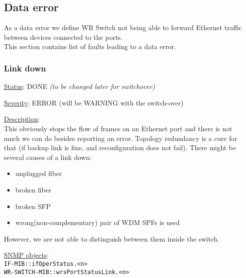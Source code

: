 \newpage
\subsection{Data error}
As a data error we define WR Switch not being able to forward Ethernet traffic
between devices connected to the ports.\\

\noindent This section contains list of faults leading to a data error.

\subsubsection{\bf Link down}
		\label{fail:data:link_down}
		\begin{packed_enum}
			\item [] \underline{Status}: DONE  \emph{(to be changed later for switchover)}
			\item [] \underline{Severity}: ERROR (will be WARNING with the
				switch-over)
			\item [] \underline{Description}:\\
				This obviously stops the flow of frames on an Ethernet port and there is
				not much we can do besides reporting an error. Topology redundancy is a
				cure for that (if backup link is fine, and reconfiguration does not
				fail). There might be several causes of a link down:
				\begin{itemize}
					\item unplugged fiber
					\item broken fiber
					\item broken SFP
					\item wrong(non-complementary) pair of WDM SPFs is used
				\end{itemize}
				However, we are not able to distinguish between them inside the switch.
			\item [] \underline{SNMP objects}:\\
				\texttt{IF-MIB::ifOperStatus.<n>}\\
				\texttt{WR-SWITCH-MIB::wrsPortStatusLink.<n>}
		\end{packed_enum}


